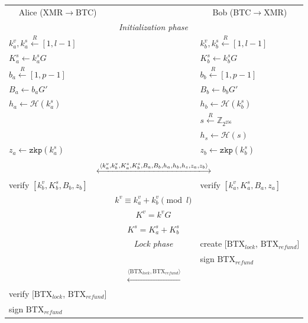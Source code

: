 \documentclass{llncs}
\renewcommand{\arraystretch}{1.5}
\begin{document}
\begin{figure}[H]
    \begin{table}[H]
        \centering
      {\renewcommand{\arraystretch}{1.1}%
      \begin{tabular}{ | l c l | }
        \hline
          \multicolumn{1}{|c}{Alice (XMR$\rightarrow$BTC)} &  & \multicolumn{1}{c|}{Bob (BTC$\rightarrow$XMR)} \\
          & \textit{Initialization phase} & \\
          $k^v_a, k^s_a \xleftarrow{R} [1, l-1]$ & & $k^v_b, k^s_b \xleftarrow{R} [1, l-1]$ \\
          $K^s_a \leftarrow k^s_aG$ & & $K^s_b \leftarrow k^s_bG$ \\
          $b_a \xleftarrow{R} [1, p-1]$ & & $b_b \xleftarrow{R} [1, p-1]$ \\
          $B_a \leftarrow b_aG'$ & & $B_b \leftarrow b_bG'$ \\
          $h_a \leftarrow \mathcal{H}(k^s_a)$ & & $h_b \leftarrow \mathcal{H}(k^s_b)$ \\
          & & $s \xleftarrow{R} \mathbb{Z}_{2^{256}}$ \\
          & & $h_s \leftarrow \mathcal{H}(s)$ \\
          $z_a \leftarrow \texttt{zkp}(k^s_a)$ & & $z_b \leftarrow \texttt{zkp}(k^s_b)$ \\
           & & \\
          \multicolumn{3}{|c|}{$\xlongleftrightarrow{\langle k^v_a, k^v_b, K^s_a, K^s_b, B_a, B_b, h_a, h_b, h_s, z_a, z_b \rangle}$} \\
          verify $[k^v_b, K^s_b, B_b, z_b]$ & & verify $[k^v_a, K^s_a, B_a, z_a]$ \\
          & $k^v \equiv k^v_a + k^v_b \pmod l$ & \\
          & $K^v = k^vG$ & \\
          & $K^s = K^s_a + K^s_b$ & \\
          & \textit{Lock phase} & create $[\text{BTX}_\textit{lock}$, $\text{BTX}_\textit{refund}]$ \\
          & & sign $\text{BTX}_\textit{refund}$ \\
          \multicolumn{3}{|c|}{$\xleftarrow{\langle \text{BTX}_\textit{lock}, \text{BTX}_\textit{refund} \rangle}$} \\
          verify $[\text{BTX}_\textit{lock}$, $\text{BTX}_\textit{refund}]$ & & \\
          sign $\text{BTX}_\textit{refund}$ & & \\

\end{tabular}}
\end{table}
\end{figure}
\end{document}
